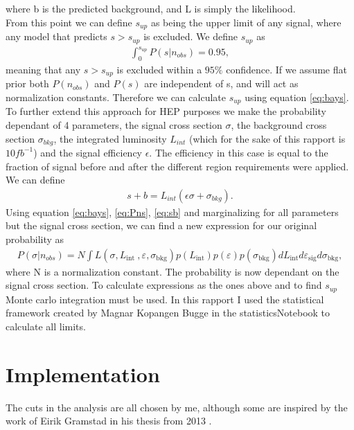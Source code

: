 \documentclass{article}
\begin{document}
where b is the predicted background, and L is simply the likelihood. 
\\
From this point we can define $s_{up}$ as being the upper limit of any signal, where any model that predicts $s>s_{up}$ is excluded. We define $s_{up}$ as
\begin{align}
    \int_0^{s_{up}} P(s|n_{obs})  = 0.95,
\end{align}
meaning that any $s>s_{up}$ is excluded within a $95\%$ confidence. If we assume flat prior both $P(n_{obs})$ and $P(s)$ are independent of s, and will act as normalization constants. Therefore we can calculate $s_{up}$ using equation \ref{eq:bays}. 
\\
To further extend this approach for HEP purposes we make the probability dependant of 4 parameters, the signal cross section $\sigma$, the background cross section $\sigma_{bkg}$,  the integrated luminosity $L_{int}$ (which for the sake of this rapport is $10fb^{-1}$) and the signal efficiency $\epsilon$. The efficiency in this case is equal to the fraction of signal before and after the different region requirements were applied. 
\\
We can define 
\begin{align}\label{eq:sb}
    s+b = L_{int} (\epsilon \sigma + \sigma_{bkg}).
\end{align}
Using equation \ref{eq:bays}, \ref{eq:Pns}, \ref{eq:sb} and marginalizing for all parameters but the signal cross section, we can find a new expression for our original probability as
\begin{align}
    P(\sigma | n_{obs}) =N \int L\left(\sigma, L_{\text {int }}, \varepsilon, \sigma_{\mathrm{bkg}}\right) p\left(L_{\mathrm{int}}\right) p\left(\varepsilon\right) p\left(\sigma_{\mathrm{bkg}}\right) d L_{\mathrm{int}} d \varepsilon_{\mathrm{sig}} d \sigma_{\mathrm{bkg}},
\end{align}
where N is a normalization constant. The probability is now dependant on the signal cross section. To calculate expressions as the ones above and to find $s_{up}$ Monte carlo integration must be used. In this rapport I used the statistical framework created by Magnar Kopangen Bugge in the statisticsNotebook to calculate all limits.
\section{Implementation}
The cuts in the analysis are all chosen by me, although some are inspired by the work of Eirik Gramstad in his thesis from 2013 \cite{Gramstad:2013loc}.
\end{document}
